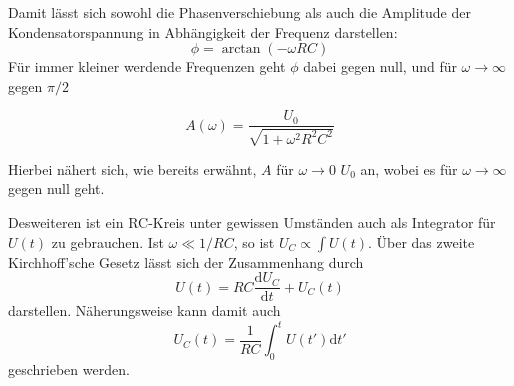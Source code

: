 Damit lässt sich sowohl die Phasenverschiebung als auch die Amplitude der Kondensatorspannung in Abhängigkeit der Frequenz 
darstellen: \begin{equation}
    \phi = \arctan(-\omega RC)
    \label{eqn:phi}
\end{equation}
Für immer kleiner werdende Frequenzen geht $\phi$ dabei gegen null, und für $\omega \to \infty$ gegen $\pi/2$

\begin{equation}
    A(\omega) = \frac{U_0}{\sqrt{1 + \omega^2 R^2 C^2}}
    \label{eqn:A}
\end{equation}

Hierbei nähert sich, wie bereits erwähnt, $A$ für $\omega \to 0$ $U_0$ an, wobei es für $\omega \to \infty$ gegen null geht. 

Desweiteren ist ein RC-Kreis unter gewissen Umständen auch als Integrator für $U(t)$ zu gebrauchen. Ist $\omega \ll 1/RC$, so ist
$U_C \propto \int U(t)$. Über das zweite Kirchhoff'sche Gesetz lässt sich der Zusammenhang durch \begin{equation}
    U(t) = RC \frac{\text{d}U_C}{\text{d}t} + U_C (t)
\end{equation} darstellen.
Näherungsweise kann damit auch \begin{equation}
    U_C (t) = \frac{1}{RC} \int_0^t U(t') \text{d} t'
\end{equation} geschrieben werden.

